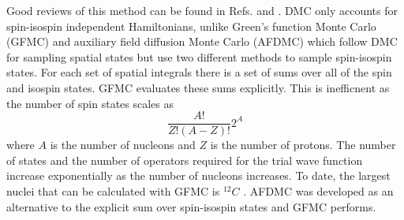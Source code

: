 Good reviews of this method can be found in Refs. \cite{foulkes2001} and  \cite{carlson2015}. DMC only accounts for spin-isospin independent Hamiltonians, unlike Green's function Monte Carlo (GFMC) and auxiliary field diffusion Monte Carlo (AFDMC) which follow DMC for sampling spatial states but use two different methods to sample spin-isospin states. For each set of spatial integrals there is a set of sums over all of the spin and isospin states. GFMC evaluates these sums explicitly. This is inefficnent as the number of spin states scales as
\begin{equation}
   \frac{A!}{Z!(A-Z)!}2^A
\end{equation}
where $A$ is the number of nucleons and $Z$ is the number of protons.
The number of states and the number of operators required for the trial wave function increase exponentially as the number of nucleons increases. To date, the largest nuclei that can be calculated with GFMC is ${}^{12}C$ \cite{lovato2013,lovato2014,lovato2015}. AFDMC was developed as an alternative to the explicit sum over spin-isospin states and GFMC performs.

